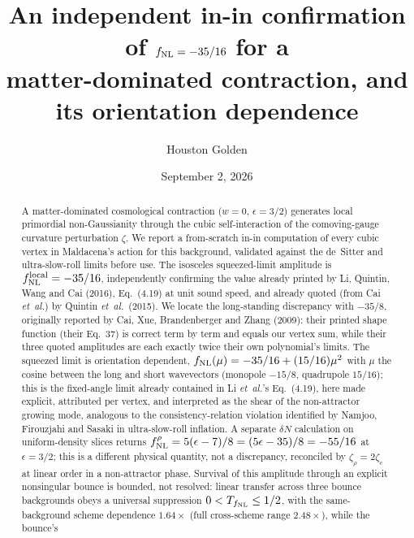 \documentclass[aps,prd,reprint,superscriptaddress,showpacs,preprintnumbers,nofootinbib,longbibliography,floatfix]{revtex4-2}
\newcommand{\fnl}{f_{\rm NL}}
\newcommand{\etal}{\textit{et~al.}}
\newcommand{\paperVersion}{v2L.0.2}
\newcommand{\paperTimestamp}{September 2, 2026}
\begin{document}
\preprint{\paperVersion}

\title{An independent in-in confirmation of $f_{\rm NL}=-35/16$ for a \\
matter-dominated contraction, and its orientation dependence}

\author{Houston Golden}

\date{\paperTimestamp}

\begin{abstract}
A matter-dominated cosmological contraction ($w=0$, $\epsilon=3/2$) generates local
primordial non-Gaussianity through the cubic self-interaction of the comoving-gauge
curvature perturbation $\zeta$. We report a from-scratch in-in computation of every
cubic vertex in Maldacena's action for this background, validated against the de~Sitter
and ultra-slow-roll limits before use. The isosceles squeezed-limit amplitude is
$f_{\rm NL}^{\rm local}=-35/16$, independently confirming the value already printed by
Li, Quintin, Wang and Cai (2016), Eq.~(4.19) at unit sound speed, and already quoted (from
Cai \etal) by Quintin \etal~(2015). We locate the long-standing discrepancy with $-35/8$,
originally reported by Cai, Xue, Brandenberger and Zhang (2009): their printed shape
function (their Eq.~37) is correct term by term and equals our vertex sum, while their
three quoted amplitudes are each exactly twice their own polynomial's limits. The squeezed
limit is orientation dependent, $f_{\rm NL}(\mu)=-35/16+(15/16)\mu^2$ with $\mu$ the
cosine between the long and short wavevectors (monopole $-15/8$, quadrupole $15/16$); this
is the fixed-angle limit already contained in Li \etal's Eq.~(4.19), here made explicit,
attributed per vertex, and interpreted as the shear of the non-attractor growing mode,
analogous to the consistency-relation violation identified by Namjoo, Firouzjahi and
Sasaki in ultra-slow-roll inflation. A separate $\delta N$ calculation on uniform-density
slices returns $f_{\rm NL}^\rho=5(\epsilon-7)/8=(5\epsilon-35)/8=-55/16$ at $\epsilon=3/2$;
this is a different physical quantity, not a discrepancy, reconciled by $\zeta_\rho=2\zeta_c$
at linear order in a non-attractor phase. Survival of this amplitude through an explicit
nonsingular bounce is bounded, not resolved: linear transfer across three bounce
backgrounds obeys a universal suppression $0<T_{\fnl}\le1/2$, with the same-background
scheme dependence $1.64\times$ (full cross-scheme range $2.48\times$), while the bounce's

\end{abstract}
\end{document}

